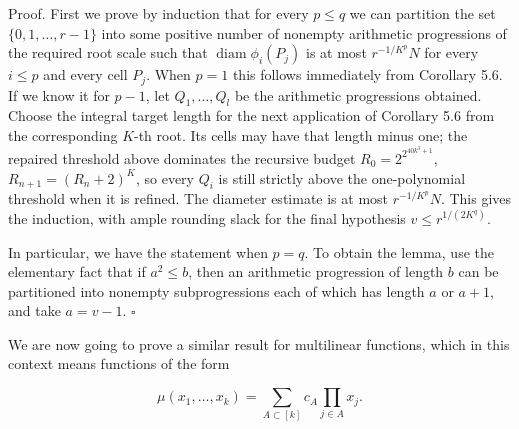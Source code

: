 \documentclass[10pt]{article}
\begin{document}
Proof. First we prove by induction that for every $p \leqslant q$ we can partition the set $\{0,1, \ldots, r-1\}$ into some positive number of nonempty arithmetic progressions of the required root scale such that $\operatorname{diam} \phi_{i}\left(P_{j}\right)$ is at most $r^{-1 / K^{p}} N$ for every $i \leqslant p$ and every cell $P_j$. When $p=1$ this follows immediately from Corollary 5.6. If we know it for $p-1$, let $Q_{1}, \ldots, Q_{l}$ be the arithmetic progressions obtained. Choose the integral target length for the next application of Corollary 5.6 from the corresponding $K$-th root.  Its cells may have that length minus one; the repaired threshold above dominates the recursive budget $R_{0}=2^{2^{40 k^{3}+1}}$, $R_{n+1}=(R_{n}+2)^{K}$, so every $Q_i$ is still strictly above the one-polynomial threshold when it is refined.  The diameter estimate is at most $r^{-1 / K^{p}} N$. This gives the induction, with ample rounding slack for the final hypothesis $v\leqslant r^{1/(2K^q)}$.

In particular, we have the statement when $p=q$. To obtain the lemma, use the elementary fact that if $a^{2} \leqslant b$, then an arithmetic progression of length $b$ can be partitioned into nonempty subprogressions each of which has length $a$ or $a+1$, and take $a=v-1$. \(\square\)

We are now going to prove a similar result for multilinear functions, which in this context means functions of the form

$$
\mu\left(x_{1}, \ldots, x_{k}\right)=\sum_{A \subset[k]} c_{A} \prod_{j \in A} x_{j} .
$$
\end{document}
